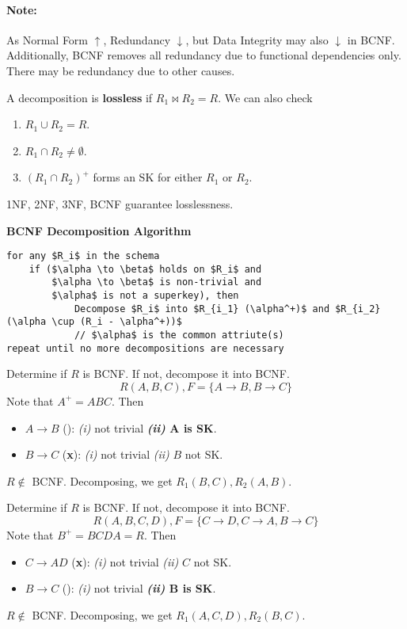 \documentclass{report}
\newenvironment{definition}[1]{\begin{tcolorbox}[title={Definition: #1}]}{\end{tcolorbox}}
\newenvironment{example}{\begin{tcolorbox}[title={Example},colback=green!5!white,colframe=black!75!green]}{\end{tcolorbox}}
\renewcommand{\bf}[1]{\textbf{{#1}}}
\renewcommand{\it}[1]{\textit{{#1}}}
\begin{document}
\paragraph{Note:} As Normal Form $\uparrow$, Redundancy $\downarrow$, but Data
Integrity may also $\downarrow$ in BCNF. Additionally, BCNF removes all
redundancy due to functional dependencies only. There may be redundancy due to
other causes.
\begin{definition}{Losslessness}
    A decomposition is \bf{lossless} if $R_1 \bowtie R_2 = R$. We can also check
    \begin{enumerate}[label=(\arabic*)]
        \item  $R_1 \cup R_2 = R$.
        \item $R_1 \cap R_2 \neq \emptyset$.
        \item $(R_1 \cap R_2)^+$ forms an SK for either $R_1$ or $R_2$.
    \end{enumerate}
    1NF, 2NF, 3NF, BCNF guarantee losslessness.
\end{definition}

\noindent\bf{BCNF Decomposition Algorithm}

\begin{lstlisting}[mathescape, style=colorEX]
for any $R_i$ in the schema
    if ($\alpha \to \beta$ holds on $R_i$ and
        $\alpha \to \beta$ is non-trivial and
        $\alpha$ is not a superkey), then
            Decompose $R_i$ into $R_{i_1} (\alpha^+)$ and $R_{i_2} (\alpha \cup (R_i - \alpha^+))$
            // $\alpha$ is the common attriute(s)
repeat until no more decompositions are necessary
\end{lstlisting}

\begin{example}
    Determine if $R$ is BCNF. If not, decompose it into BCNF.
    \[R(A, B, C), F = \{A \to B, B \to C\}\]
    Note that $A^+ = ABC$. Then
    \begin{itemize}[label=$\to$]
        \item $A \to B$ (\checkmark): \it{(i)} not trivial \bf{\it{(ii)} $\bm{A}$ is SK}.
        \item $B \to C$ (\bf{\textsf{x}}): \it{(i)} not trivial \it{(ii)} $B$ not SK.
    \end{itemize}
    $R \not \in$ BCNF. Decomposing, we get $R_1(B, C), R_2(A, B)$.
\end{example}

\begin{example}
    Determine if $R$ is BCNF. If not, decompose it into BCNF.
    \[R(A, B, C, D), F = \{C \to D, C \to A, B \to C\}\]
    Note that $B^+ = BCDA = R$. Then
    \begin{itemize}[label=$\to$]
        \item $C \to AD$ (\bf{\textsf{x}}): \it{(i)} not trivial \it{(ii)} $C$ not SK.
        \item $B \to C$ (\checkmark): \it{(i)} not trivial \bf{\it{(ii)} $\bm{B}$ is SK}.
    \end{itemize}
    $R \not \in$ BCNF. Decomposing, we get $R_1(A, C, D), R_2(B, C)$.
\end{example}
\end{document}
